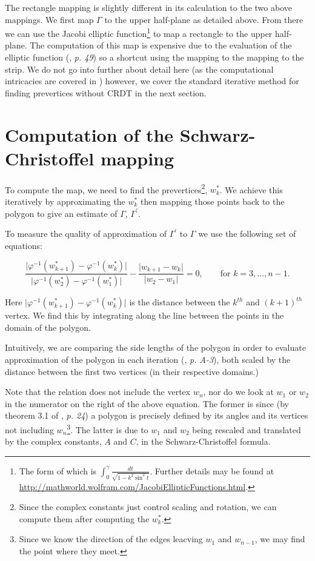 \documentclass[a4paper,10pt]{amsart}
\newcommand{\sch}{Schwarz-Christoffel }
\newcommand{\phiinv}{\phi^{-1}}
\renewcommand{\phi}{\varphi}
\begin{document}
The rectangle mapping is slightly different in its calculation to the two above mappings. We first map $\Gamma$ to the upper half-plane as detailed above. From there we can use the Jacobi elliptic function\footnote{The form of which is $\int_0^\gamma \frac{dt}{\sqrt{1-k^2\sin^2t}}$. Further details may be found at \url{http://mathworld.wolfram.com/JacobiEllipticFunctions.html}.} to map a rectangle to the upper half-plane. The computation of this map is expensive due to the evaluation of the elliptic function (\cite{driscoll}, \emph{p. 49}) so a shortcut using the mapping to the mapping to the strip. We do not go into further about detail here (as the computational intricacies are covered in \cite{howell90}) however, we cover the standard iterative method for finding prevertices without CRDT in the next section.



\section{Computation of the \sch mapping}

To compute the map, we need to find the prevertices\footnote{Since the complex constants just control scaling and rotation, we can compute them after computing the $w^*_k$.}, $w^*_k$. We achieve this iteratively by approximating the $w^*_k$ then mapping those points back to the polygon to give an estimate of $\Gamma$, $\Gamma^\prime$. 

To measure the quality of approximation of $\Gamma^\prime$ to $\Gamma$ we use the following set of equations:

\begin{equation}
\label{optimizeme}
\frac{\vert \phiinv(w^*_{k+1}) -  \phiinv(w^*_k) \vert}{\vert \phiinv(w^*_2)-\phiinv(w^*_1)\vert} - \frac{\vert w_{k+1} - w_k\vert}{\vert w_2 - w_1\vert} = 0, \qquad \text{for } k=3,\dots,n-1.
\end{equation}

Here $\vert \phiinv(w^*_{k+1}) -  \phiinv(w^*_k) \vert$ is the distance between the $k^{th}$ and $(k+1)^{th}$ vertex.  We find this by integrating along the line between the points in the domain of the polygon.

Intuitively, we are comparing the side lengths of the polygon in order to evaluate approximation of the polygon in each iteration (\cite{snider}, \emph{p. A-3}), both scaled by the distance between the first two vertices (in their respective domains.)

Note that the relation does not include the vertex $w_n$, nor do we look at $w_1$ or $w_2$ in the numerator on the right of the above equation. The former is since (by theorem 3.1 of \cite{driscoll}, \emph{p. 24}) a polygon is precisely defined by its angles and its vertices not including $w_n$\footnote{Since we know the direction of the edges leacving $w_1$ and $w_{n-1}$, we may find the point where they meet.}. The latter is due to $w_1$ and $w_2$ being rescaled and translated by the complex constants, $A$ and $C$, in the \sch formula.
\end{document}
